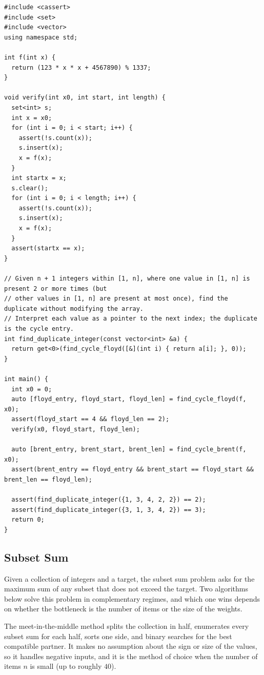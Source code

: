\begin{lstlisting}[style=cpp]
#include <cassert>
#include <set>
#include <vector>
using namespace std;

int f(int x) {
  return (123 * x * x + 4567890) % 1337;
}

void verify(int x0, int start, int length) {
  set<int> s;
  int x = x0;
  for (int i = 0; i < start; i++) {
    assert(!s.count(x));
    s.insert(x);
    x = f(x);
  }
  int startx = x;
  s.clear();
  for (int i = 0; i < length; i++) {
    assert(!s.count(x));
    s.insert(x);
    x = f(x);
  }
  assert(startx == x);
}

// Given n + 1 integers within [1, n], where one value in [1, n] is present 2 or more times (but
// other values in [1, n] are present at most once), find the duplicate without modifying the array.
// Interpret each value as a pointer to the next index; the duplicate is the cycle entry.
int find_duplicate_integer(const vector<int> &a) {
  return get<0>(find_cycle_floyd([&](int i) { return a[i]; }, 0));
}

int main() {
  int x0 = 0;
  auto [floyd_entry, floyd_start, floyd_len] = find_cycle_floyd(f, x0);
  assert(floyd_start == 4 && floyd_len == 2);
  verify(x0, floyd_start, floyd_len);

  auto [brent_entry, brent_start, brent_len] = find_cycle_brent(f, x0);
  assert(brent_entry == floyd_entry && brent_start == floyd_start && brent_len == floyd_len);

  assert(find_duplicate_integer({1, 3, 4, 2, 2}) == 2);
  assert(find_duplicate_integer({3, 1, 3, 4, 2}) == 3);
  return 0;
}
\end{lstlisting}
\subsection{Subset Sum}
\label{sec:1.8.5}
Given a collection of integers and a target, the subset sum problem asks for the maximum sum of any subset that does not exceed the target. Two algorithms below solve this problem in complementary regimes, and which one wins depends on whether the bottleneck is the number of items or the size of the weights.

The meet-in-the-middle method splits the collection in half, enumerates every subset sum for each half, sorts one side, and binary searches for the best compatible partner. It makes no assumption about the sign or size of the values, so it handles negative inputs, and it is the method of choice when the number of items $n$ is small (up to roughly $40$).

